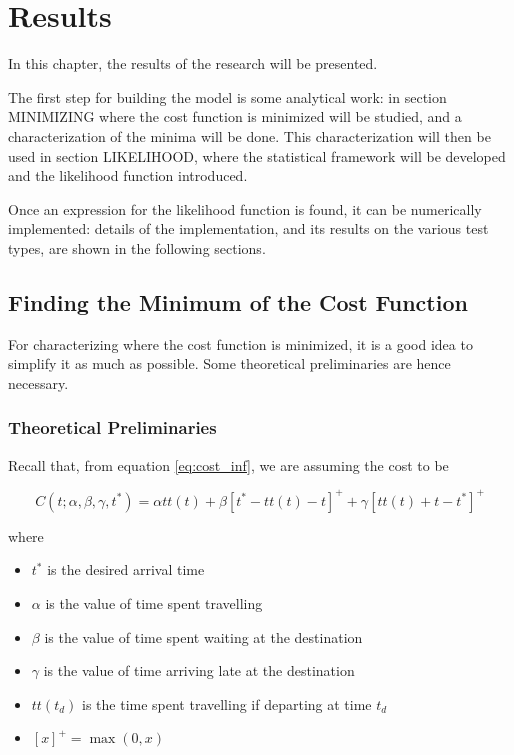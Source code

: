 \chapter{Results}
\label{chap:res}

In this chapter, the results of the research will be presented.

The first step for building the model is some analytical work:
in section MINIMIZING where the cost function is minimized will be studied,
and a characterization of the minima will be done.
This characterization will then be used in section LIKELIHOOD,
where the statistical framework will be developed and the likelihood function introduced.

Once an expression for the likelihood function is found,
it can be numerically implemented:
details of the implementation, and its results on the various test types,
are shown in the following sections.

\section{Finding the Minimum of the Cost Function}
\label{sec:minimum}

For characterizing where the cost function is minimized,
it is a good idea to simplify it as much as possible.
Some theoretical preliminaries are hence necessary.

\subsection{Theoretical Preliminaries}
\label{sec:pre_minimizing}

Recall that, from equation \eqref{eq:cost_inf}, we are assuming the cost to be

\begin{equation*}
  C(t; \alpha, \beta, \gamma, t^*) = \alpha tt(t) + \beta [t^* - tt(t) - t]^+ + \gamma[tt(t) + t - t^*]^+
\end{equation*}

where

\begin{itemize}
\item \(t^*\) is the desired arrival time
\item \(\alpha\) is the value of time spent travelling
\item \(\beta\) is the value of time spent waiting at the destination
\item \(\gamma\) is the value of time arriving late at the destination
\item \(tt(t_d)\) is the time spent travelling if departing at time \(t_d\)
\item \([x]^+ = \max(0, x)\)
\end{itemize}

